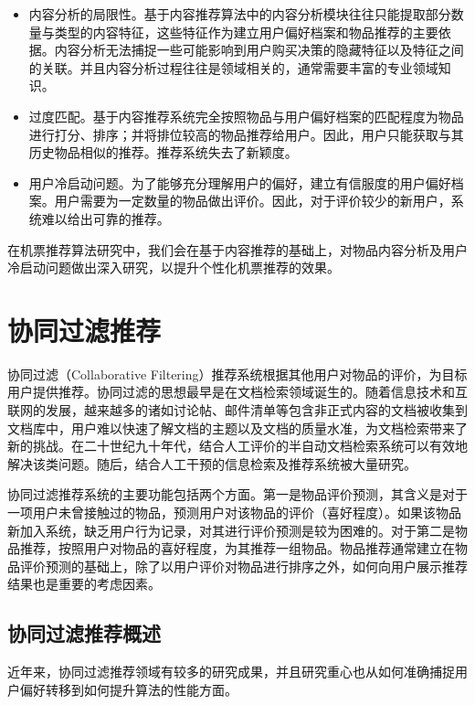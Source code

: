 \begin{itemize}
	\item 内容分析的局限性。基于内容推荐算法中的内容分析模块往往只能提取部分数量与类型的内容特征，这些特征作为建立用户偏好档案和物品推荐的主要依据。内容分析无法捕捉一些可能影响到用户购买决策的隐藏特征以及特征之间的关联。并且内容分析过程往往是领域相关的，通常需要丰富的专业领域知识。
	\item 过度匹配。基于内容推荐系统完全按照物品与用户偏好档案的匹配程度为物品进行打分、排序；并将排位较高的物品推荐给用户。因此，用户只能获取与其历史物品相似的推荐。推荐系统失去了新颖度。
	\item 用户冷启动问题。为了能够充分理解用户的偏好，建立有信服度的用户偏好档案。用户需要为一定数量的物品做出评价。因此，对于评价较少的新用户，系统难以给出可靠的推荐。
\end{itemize}

在机票推荐算法研究中，我们会在基于内容推荐的基础上，对物品内容分析及用户冷启动问题做出深入研究，以提升个性化机票推荐的效果。


\section{协同过滤推荐}

协同过滤（Collaborative Filtering）推荐系统根据其他用户对物品的评价，为目标用户提供推荐。协同过滤的思想最早是在文档检索领域诞生的。随着信息技术和互联网的发展，越来越多的诸如讨论帖、邮件清单等包含非正式内容的文档被收集到文档库中，用户难以快速了解文档的主题以及文档的质量水准，为文档检索带来了新的挑战。在二十世纪九十年代，结合人工评价的半自动文档检索系统可以有效地解决该类问题。随后，结合人工干预的信息检索及推荐系统被大量研究。

协同过滤推荐系统的主要功能包括两个方面。第一是物品评价预测，其含义是对于一项用户未曾接触过的物品，预测用户对该物品的评价（喜好程度）。如果该物品新加入系统，缺乏用户行为记录，对其进行评价预测是较为困难的。对于第二是物品推荐，按照用户对物品的喜好程度，为其推荐一组物品。物品推荐通常建立在物品评价预测的基础上，除了以用户评价对物品进行排序之外，如何向用户展示推荐结果也是重要的考虑因素。


\subsection{协同过滤推荐概述}

近年来，协同过滤推荐领域有较多的研究成果，并且研究重心也从如何准确捕捉用户偏好转移到如何提升算法的性能方面。







